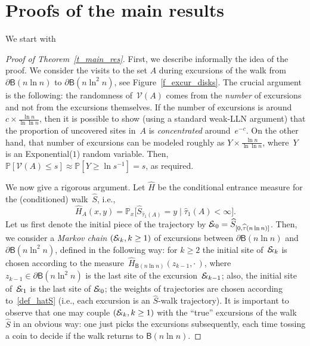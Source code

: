 \documentclass[10pt]{amsart}
\theoremstyle{definition}\newtheorem{defi}[theo]{Definition}\newtheorem{rema}[theo]{Remark}\newtheorem{exam}[theo]{Example}\newtheorem{exem}[theo]{Example}\newtheorem{nota}[theo]{Notation}
\newcommand{\1}[1]{{\mathbf 1}{\{#1\}}}
\newcommand{\V}{{\mathcal V}}
\newcommand{\Ex}{{\mathcal{E}\!\!\text{\footnotesize{\textsl{x}}}}}
\newcommand{\s}{{\widehat S}}
\newcommand{\8}{{\infty}}
\newcommand{\IP}{{\mathbb P}}
\newcommand{\hH}{{\widehat H}}
\newcommand{\htau}{\widehat{\tau}}
\newcommand{\B}{{\mathsf B}}
\begin{document}
\section{Proofs of the main results}\label{s_proofs}

We start with

\begin{proof}[Proof of Theorem~\ref{t_main_res}]
First, we describe informally the idea of the proof. We consider the visits to the set $A$ during excursions of the walk from $\partial\B(n\ln n)$ to $\partial\B(n\ln^2 n)$, see Figure~\ref{f_excur_disks}. The crucial argument is the following: the randomness of~$\V(A)$ comes from the \emph{number} of excursions and not from the excursions themselves. If the number of excursions is around $c\times\frac{\ln n}{\ln\ln n}$, then it is possible to show (using a standard weak-LLN argument) that the proportion of uncovered sites in~$A$ is \emph{concentrated} around~$e^{-c}$. On the other hand, that number of excursions can be modeled roughly as $Y \times\frac{\ln n}{\ln\ln n}$, where~$Y$ is an Exponential($1$) random variable. Then, $\IP[\V(A)\leq s]\approx \IP[Y\geq \ln s^{-1}]=s$, as required.

We now give a rigorous argument. Let $\hH$ be the conditional entrance measure for the (conditioned) walk~$\s$, i.e.,
\begin{equation}\label{df_hatH}
\hH_A(x,y) = \IP_x\big[\s_{\htau_1(A)}=y \mid \htau_1(A)<\infty\big].
\end{equation}
Let us first denote the initial piece of the trajectory by $\Ex_0=\s_{[0,\htau(n\ln n)]}$. Then, we consider a \emph{Markov chain} $(\Ex_k,k\geq 1)$ of excursions between $\partial\B(n\ln n)$ and $\partial\B(n\ln^2 n)$, defined in the following way: for $k\geq 2$ the initial site of~$\Ex_k$ is chosen according to the measure~$\hH_{\B(n\ln n)}(z_{k-1},\cdot\,)$, where $z_{k-1}\in\partial\B(n\ln^2 n)$ is the last site of the excursion~$\Ex_{k-1}$; also, the initial site of~$\Ex_1$ is the last site of $\Ex_0$; the weights of trajectories are chosen according to~\eqref{def_hatS} (i.e., each excursion is an $\s$-walk trajectory). It is important to observe that one may couple $(\Ex_k,k\geq 1)$ with the ``true'' excursions of the walk~$\s$ in an obvious way: one just picks the excursions subsequently, each time tossing a coin to decide if the walk returns to $\B(n\ln n)$.


\end{proof}
\end{document}
